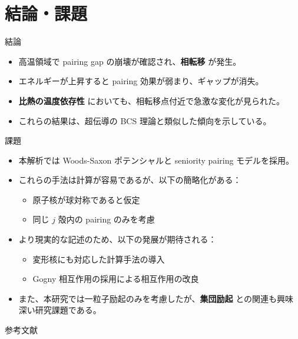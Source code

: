 \documentclass[aspectratio=169, 12pt, dvipdfmx]{beamer}
\begin{document}
\section{結論・課題}

\begin{frame}{結論}
  \begin{itemize}
    \item 高温領域で pairing gap の崩壊が確認され、\textbf{相転移} が発生。
    \item エネルギーが上昇すると pairing 効果が弱まり、ギャップが消失。
    \item \textbf{比熱の温度依存性} においても、相転移点付近で急激な変化が見られた。
    \item これらの結果は、超伝導の BCS 理論と類似した傾向を示している。
  \end{itemize}
\end{frame}


\begin{frame}{課題}
  \begin{itemize}
    \item 本解析では Woods-Saxon ポテンシャルと seniority pairing モデルを採用。
    \item これらの手法は計算が容易であるが、以下の簡略化がある：
      \begin{itemize}
        \item 原子核が球対称であると仮定
        \item 同じ \( j \) 殻内の pairing のみを考慮
      \end{itemize}
    \item より現実的な記述のため、以下の発展が期待される：
      \begin{itemize}
        \item 変形核にも対応した計算手法の導入
        \item Gogny 相互作用の採用による相互作用の改良
      \end{itemize}
    \item また、本研究では一粒子励起のみを考慮したが、\textbf{集団励起} との関連も興味深い研究課題である。
  \end{itemize}
\end{frame}


\begin{frame}{参考文献}
  \scriptsize
	\beamertemplatetextbibitems
	
  
\end{frame}

\appendix
\end{document}
